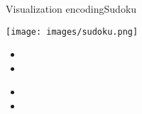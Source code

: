 \begin{frame}{Visualization encoding}{Sudoku}
  \centering
  \begin{minipage}{.3\textwidth}
    \texttt{[image: images/sudoku.png]}
  \end{minipage}
  \begin{minipage}{.3\textwidth}
    \begin{itemize}
      \item {}
      \item {}
    \end{itemize}
  \end{minipage}
  \begin{minipage}{.3\textwidth}
    \begin{itemize}
      \item {}
      \item {}
    \end{itemize}
  \end{minipage}
  \pause
  \bigskip
  
\end{frame}
%

